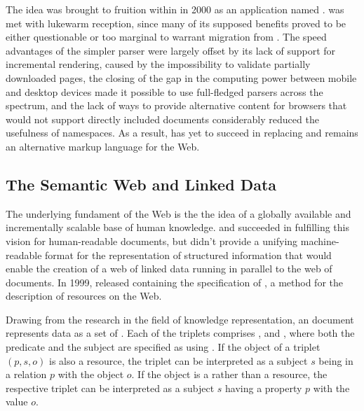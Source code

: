 \documentclass{book}
\begin{document}
The idea was brought to fruition within \cite{pemberton00} in 2000 as an
 application named .  was met with
lukewarm reception, since many of its supposed benefits proved to be either
questionable or too marginal to warrant migration from . The
speed advantages of the simpler parser were largely offset by its lack of
support for incremental rendering, caused by the impossibility to validate
partially downloaded pages, the closing of the gap in the computing power
between mobile and desktop devices made it possible to use full-fledged
 parsers across the spectrum, and the lack of ways to provide
alternative content for browsers that would not support directly included
 documents considerably reduced the usefulness of 
namespaces. As a result,  has yet to succeed in replacing
 and remains an alternative markup language for the Web.


\subsection{The Semantic Web and Linked Data}
The underlying fundament of the Web is the the idea of a globally available and
incrementally scalable base of human knowledge.   and
 succeeded in fulfilling this vision for human-readable
documents, but didn't provide a unifying machine-readable format for the
representation of structured information that would enable the creation of a web
of linked data running in parallel to the web of documents. In 1999,
 released \cite{lassira99} containing the specification of
, a method for the description of resources on the Web.

Drawing from the research in the field of knowledge representation, an
 document represents data as a set of 
. Each of the triplets comprises , 
and , where both the predicate and the
subject are specified as   using
. If the object of a triplet $(p,s,o)$ is also a resource, the
triplet can be interpreted as a subject $s$ being in a relation $p$ with the
object $o$. If the object is a  
rather than a resource, the respective triplet can be interpreted as a subject
$s$ having a property $p$ with the value $o$.
\end{document}
